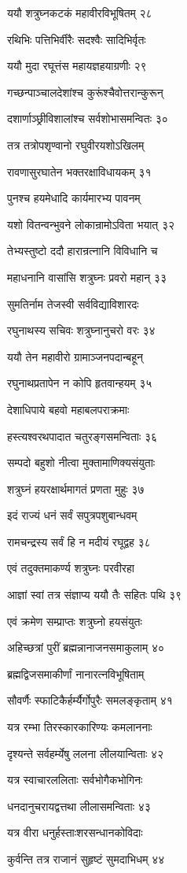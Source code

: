 ययौ शत्रुघ्नकटकं महावीरविभूषितम् २८

रथिभिः पत्तिभिर्वीरैः सदश्वैः सादिभिर्वृतः

ययौ मुदा रघूत्तंस महायज्ञहयाग्रणीः २९

गच्छन्पाञ्चालदेशांश्च कुरूंश्चैवोत्तरान्कुरून्

दशार्णाञ्छ्रीविशालांश्च सर्वशोभासमन्वितः ३०

तत्र तत्रोपशृण्वानो रघुवीरयशोऽखिलम्

रावणासुरघातेन भक्तरक्षाविधायकम् ३१

पुनश्च हयमेधादि कार्यमारभ्य पावनम्

यशो वितन्वन्भुवने लोकान्रामोऽविता भयात् ३२

तेभ्यस्तुष्टो ददौ हारान्रत्नानि विविधानि च

महाधनानि वासांसि शत्रुघ्नः प्रवरो महान् ३३

सुमतिर्नाम तेजस्वी सर्वविद्याविशारदः

रघुनाथस्य सचिवः शत्रुघ्नानुचरो वरः ३४

ययौ तेन महावीरो ग्रामाञ्जनपदान्बहून्

रघुनाथप्रतापेन न कोपि हृतवान्हयम् ३५

देशाधिपाये बहवो महाबलपराक्रमाः

हस्त्यश्वरथपादात चतुरङ्गसमन्विताः ३६

सम्पदो बहुशो नीत्वा मुक्तामाणिक्यसंयुताः

शत्रुघ्नं हयरक्षार्थमागतं प्रणता मुहुः ३७

इदं राज्यं धनं सर्वं सपुत्रपशुबान्धवम्

रामचन्द्रस्य सर्वं हि न मदीयं रघूद्वह ३८

एवं तदुक्तमाकर्ण्य शत्रुघ्नः परवीरहा

आज्ञां स्वां तत्र संज्ञाप्य ययौ तैः सहितः पथि ३९

एवं क्रमेण सम्प्राप्तः शत्रुघ्नो हयसंयुतः

अहिच्छत्रां पुरीं ब्रह्मन्नानाजनसमाकुलाम् ४०

ब्रह्मद्विजसमाकीर्णां नानारत्नविभूषिताम्

सौवर्णैः स्फाटिकैर्हर्म्यैर्गोपुरैः समलङ्कृताम् ४१

यत्र रम्भा तिरस्कारकारिण्यः कमलाननाः

दृश्यन्ते सर्वहर्म्येषु ललना लीलयान्विताः ४२

यत्र स्वाचारललिताः सर्वभोगैकभोगिनः

धनदानुचरायद्वत्तथा लीलासमन्विताः ४३

यत्र वीरा धनुर्हस्ताःशरसन्धानकोविदाः

कुर्वन्ति तत्र राजानं सुहृष्टं सुमदाभिधम् ४४

